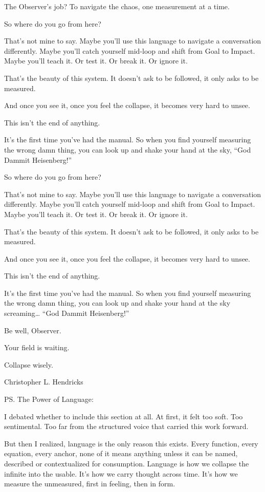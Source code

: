 \documentclass[11pt]{article}
\begin{document}
The Observer’s job?
To navigate the chaos, one measurement at a time.

So where do you go from here?

That’s not mine to say. Maybe you’ll use this language to navigate a conversation differently. Maybe you’ll catch yourself mid-loop and shift from Goal to Impact. Maybe you’ll teach it. Or test it. Or break it. Or ignore it.

That’s the beauty of this system. It doesn’t ask to be followed, it only asks to be measured.

And once you see it, once you feel the collapse, it becomes very hard to unsee.

This isn’t the end of anything.

It’s the first time you’ve had the manual. So when you find yourself measuring the wrong damn thing, you can look up and shake your hand at the sky, “God Dammit Heisenberg!”

So where do you go from here?

That’s not mine to say. Maybe you’ll use this language to navigate a conversation differently.
Maybe you’ll catch yourself mid-loop and shift from Goal to Impact. Maybe you’ll teach it. Or test it. Or break it. Or ignore it.

That’s the beauty of this system. It doesn’t ask to be followed, it only asks to be measured.

And once you see it, once you feel the collapse, it becomes very hard to unsee.

This isn’t the end of anything.

It’s the first time you’ve had the manual.
So when you find yourself measuring the wrong damn thing, you can look up and shake your hand at the sky screaming… “God Dammit Heisenberg!”

Be well, Observer.

Your field is waiting.

Collapse wisely.

Christopher L. Hendricks

PS. The Power of Language:

I debated whether to include this section at all. At first, it felt too soft. Too sentimental. Too far from the structured voice that carried this work forward.

But then I realized, language is the only reason this exists. Every function, every equation, every anchor, none of it means anything unless it can be named, described or contextualized for consumption. Language is how we collapse the infinite into the usable. It’s how we carry thought across time. It’s how we measure the unmeasured, first in feeling, then in form.
\end{document}
